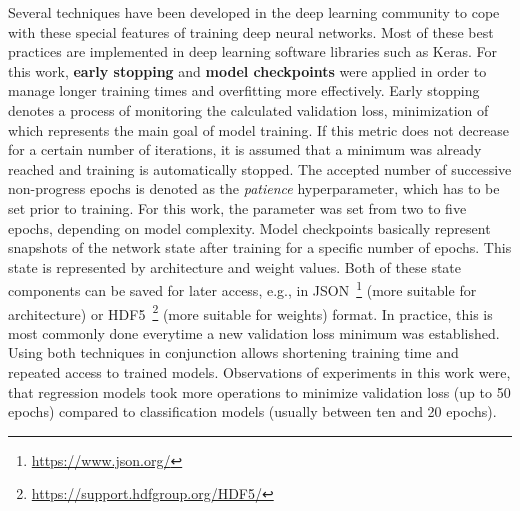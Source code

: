 Several techniques have been developed in the deep learning community to cope
with these special features of training deep neural networks.
Most of these best practices are implemented in deep learning software libraries
such as Keras.
For this work, \textbf{early stopping} and \textbf{model checkpoints} were applied
in order to manage longer training times and overfitting more effectively.
Early stopping denotes a process of monitoring the calculated validation loss,
minimization of which represents the main goal of model training.
If this metric does not decrease for a certain number of iterations, it is assumed
that a minimum was already reached and training is automatically stopped.
The accepted number of successive non-progress epochs is denoted as the
\textit{patience} hyperparameter, which has to be set prior to training.
For this work, the parameter was set from two to five epochs, depending on
model complexity.
Model checkpoints basically represent snapshots of the network state after training
for a specific number of epochs.
This state is represented by architecture and weight values.
Both of these state components can be saved for later access, e.g., in JSON~\footnote{\url{https://www.json.org/}} 
(more suitable for architecture) or HDF5~\footnote{\url{https://support.hdfgroup.org/HDF5/}}
(more suitable for weights) format.
In practice, this is most commonly done everytime a new validation loss minimum
was established.
Using both techniques in conjunction allows shortening training time and
repeated access to trained models.
Observations of experiments in this work were, that regression models took
more operations to minimize validation loss (up to 50 epochs) compared
to classification models (usually between ten and 20 epochs).

